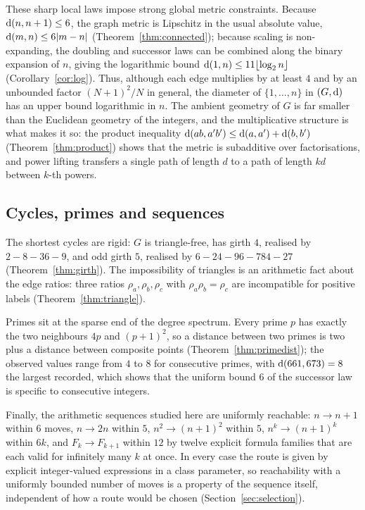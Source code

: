 These sharp local laws impose strong global metric constraints. Because $\operatorname{d}(n,n+1)\le6$, the graph metric is Lipschitz in the usual absolute value, $\operatorname{d}(m,n)\le6|m-n|$ (Theorem~\ref{thm:connected}); because scaling is non-expanding, the doubling and successor laws can be combined along the binary expansion of $n$, giving the logarithmic bound $\operatorname{d}(1,n)\le11\lfloor\log_2n\rfloor$ (Corollary~\ref{cor:log}). Thus, although each edge multiplies by at least $4$ and by an unbounded factor $(N+1)^2/N$ in general, the diameter of $\{1,\dots,n\}$ in $(G,\operatorname{d})$ has an upper bound logarithmic in $n$. The ambient geometry of $G$ is far smaller than the Euclidean geometry of the integers, and the multiplicative structure is what makes it so: the product inequality $\operatorname{d}(ab,a'b')\le\operatorname{d}(a,a')+\operatorname{d}(b,b')$ (Theorem~\ref{thm:product}) shows that the metric is subadditive over factorisations, and power lifting transfers a single path of length $d$ to a path of length $kd$ between $k$-th powers.

\subsection{Cycles, primes and sequences}
The shortest cycles are rigid: $G$ is triangle-free, has girth $4$, realised by $2\!-\!8\!-\!36\!-\!9$, and odd girth $5$, realised by $6\!-\!24\!-\!96\!-\!784\!-\!27$ (Theorem~\ref{thm:girth}). The impossibility of triangles is an arithmetic fact about the edge ratios: three ratios $\rho_a,\rho_b,\rho_c$ with $\rho_a\rho_b=\rho_c$ are incompatible for positive labels (Theorem~\ref{thm:triangle}).

Primes sit at the sparse end of the degree spectrum. Every prime $p$ has exactly the two neighbours $4p$ and $(p+1)^2$, so a distance between two primes is two plus a distance between composite points (Theorem~\ref{thm:primedist}); the observed values range from $4$ to $8$ for consecutive primes, with $\operatorname{d}(661,673)=8$ the largest recorded, which shows that the uniform bound $6$ of the successor law is specific to consecutive integers.

Finally, the arithmetic sequences studied here are uniformly reachable: $n\to n+1$ within $6$ moves, $n\to2n$ within $5$, $n^2\to(n+1)^2$ within $5$, $n^k\to(n+1)^k$ within $6k$, and $F_k\to F_{k+1}$ within $12$ by twelve explicit formula families that are each valid for infinitely many $k$ at once. In every case the route is given by explicit integer-valued expressions in a class parameter, so reachability with a uniformly bounded number of moves is a property of the sequence itself, independent of how a route would be chosen (Section~\ref{sec:selection}).

